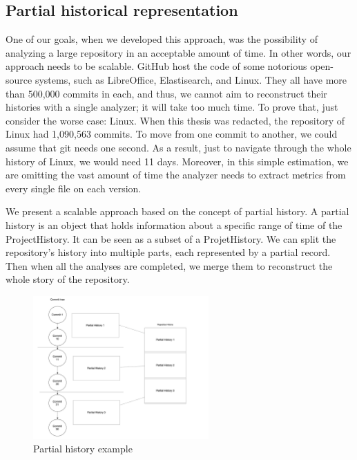 \label{s:partialHistoricalRepr}
\subsection*{Partial historical representation}
One of our goals, when we developed this approach, was the possibility of analyzing a large repository in an acceptable amount of time. 
In other words, our approach needs to be scalable.
GitHub host the code of some notorious open-source systems, such as LibreOffice, Elastisearch, and Linux.
They all have more than 500,000 commits in each, and thus, we cannot aim to reconstruct their histories with a single analyzer; it will take too much time.  
To prove that, just consider the worse case: Linux. 
When this thesis was redacted, the repository of Linux had 1,090,563 commits. 
To move from one commit to another, we could assume that git needs one second. 
As a result, just to navigate through the whole history of Linux, we would need 11 days.
Moreover, in this simple estimation, we are omitting the vast amount of time the analyzer needs to extract metrics from every single file on each version. 

We present a scalable approach based on the concept of partial history.
A partial history is an object that holds information about a specific range of time of the ProjectHistory. 
It can be seen as a subset of a ProjetHistory. 
We can split the repository's history into multiple parts, each represented by a partial record. Then when all the analyses are completed, we merge them to reconstruct the whole story of the repository.


\begin{figure}
    \begin{center}
        \includegraphics[width=0.6\textwidth]{PartialHistory.png}
    \end{center}
    \caption{Partial history example}
    \label{fig:PartialHistory}
\end{figure}

